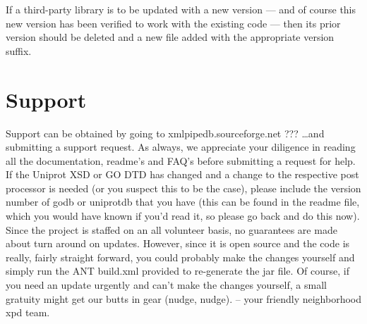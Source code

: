 \documentclass[11pt]{article}
\begin{document}
If a third-party library is to be updated with a new version --- and of course this new version has been verified to work with the existing code --- then its prior version should be deleted and a new file added with the appropriate version suffix.

\section{Support}
\label{support}
Support can be obtained by going to xmlpipedb.sourceforge.net ??? \ldots and submitting a support request. As always, we appreciate your diligence in reading all the documentation, readme's and FAQ's before submitting a request for help. If the Uniprot XSD or GO DTD has changed and a change to the respective post processor is needed (or you suspect this to be the case), please include the version number of godb or uniprotdb that you have (this can be found in the readme file, which you would have known if you'd read it, so please go back and do this now). Since the project is staffed on an all volunteer basis, no guarantees are made about turn around on updates. However, since it is open source and the code is really, fairly straight forward, you could probably make the changes yourself and simply run the ANT build.xml provided to re-generate the jar file. Of course, if you need an update urgently and can't make the changes yourself, a small gratuity might get our butts in gear (nudge, nudge). -- your friendly neighborhood xpd team.
\end{document}
